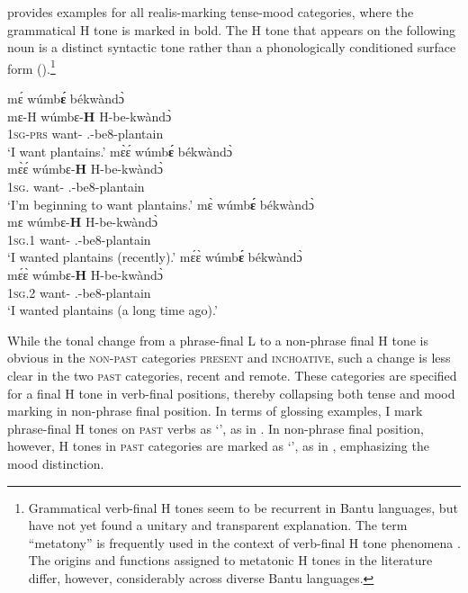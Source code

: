  provides examples for all realis-marking tense-mood categories, where the grammatical H tone is marked in bold. The H tone that appears on the following noun is a distinct syntactic tone rather than a phonologically conditioned surface form ().\footnote{Grammatical verb-final H tones seem to be recurrent in Bantu languages, but have not yet found a unitary and transparent explanation. The term ``metatony'' is frequently used in the context of verb-final H tone phenomena \citep{dimmendaal95, angenot71, hyman2012, schadeberg95, hadermann2005,costa2008, makasso2012, nurse08}. The origins and functions assigned to metatonic H tones in the literature differ, however, considerably across diverse Bantu languages.}


\ea\label{M}
\ea  \label{M1}
  \glll  mɛ́ wúmb{\bfseries ɛ́} békwàndɔ̀ \\
          mɛ-H wúmbɛ-{\bfseries H} H-be-kwàndɔ̀\\
         1\textsc{sg}-\textsc{prs} want-{\R} {\OBJ}.{\LINK}-be8-plantain\\
    \trans `I want plantains.'
\ex\label{M2}
  \glll   mɛ̀ɛ́ wúmb{\bfseries ɛ́} békwàndɔ̀ \\
        mɛ̀ɛ́ wúmbɛ-{\bfseries H} H-be-kwàndɔ̀ \\
          1\textsc{sg}.{\INCH} want-{\R} {\OBJ}.{\LINK}-be8-plantain\\
    \trans `I'm beginning to want plantains.'
\ex\label{M3}
  \glll   mɛ̀ wúmb{\bfseries ɛ́} békwàndɔ̀ \\
         mɛ wúmbɛ-{\bfseries H} H-be-kwàndɔ̀ \\
          1\textsc{sg}.{\PST}1 want-{\R} {\OBJ}.{\LINK}-be8-plantain\\
    \trans `I wanted plantains (recently).'
\ex\label{M4}
  \glll   mɛ́ɛ̀ wúmb{\bfseries ɛ́} békwàndɔ̀ \\
          mɛ́ɛ̀ wúmbɛ-{\bfseries H} H-be-kwàndɔ̀ \\
          1\textsc{sg}.{\PST}2 want-{\R} {\OBJ}.{\LINK}-be8-plantain\\
    \trans `I wanted plantains (a long time ago).'
\z
\z

While the tonal change from a phrase-final L to a non-phrase final H tone is obvious in the \textsc{non-past} categories \textsc{present} and \textsc{inchoative}, such a change is less clear in the two \textsc{past} categories, recent and remote. These categories are specified for a final H tone  in verb-final positions, thereby collapsing both tense and mood marking in non-phrase final position.  In terms of glossing examples, I mark phrase-final H tones on \textsc{past} verbs as `{\PST}', as in . In  non-phrase final position, however, H tones in \textsc{past} categories are marked as `{\R}', as in , emphasizing the mood distinction.

